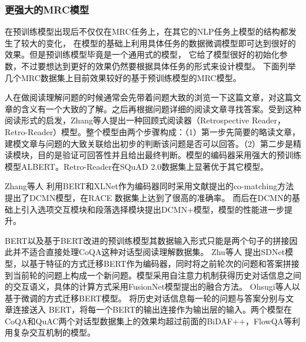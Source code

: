 \subsubsection{更强大的MRC模型}
在预训练模型出现后不仅仅在MRC任务上，在其它的NLP任务上模型的结构都发生了较大的变化，
在模型的基础上利用具体任务的数据微调模型即可达到很好的效果。但是预训练模型毕竟是一个通用式的模型，
它给了模型很好的初始化参数，不过要想达到更好的效果仍然要根据具体任务的形式来设计模型。
下面列举几个MRC数据集上目前效果较好的基于预训练模型的MRC模型。

人在做阅读理解问题的时候通常会先带着问题大致的浏览一下这篇文章，对这篇文章的含义有一个大致的了解。之后再根据问题详细的阅读文章寻找答案。受到这种阅读形式的启发，Zhang等人提出一种回顾式阅读器（Retrospective Reader，Retro-Reader）模型。整个模型由两个步骤构成：（1）第一步先简要的略读文章，建模文章与问题的大致关联给出初步的判断该问题是否可以回答。（2）第二步是精读模块，目的是验证可回答性并且给出最终判断。模型的编码器采用强大的预训练模型ALBERT。Retro-Reader在SQuAD 2.0数据集上显著优于其它模型。

Zhang等人
利用BERT和XLNet作为编码器同时采用文献\cite{Co-matching}提出的co-matching方法提出了DCMN模型，在RACE
数据集上达到了很高的准确率。
而后在DCMN的基础上引入选项交互模块和段落选择模块提出DCMN+模型，模型的性能进一步提升。

BERT以及基于BERT改进的预训练模型其数据输入形式只能是两个句子的拼接因此并不适合直接处理CoQA这种对话型阅读理解数据集。
Zhu等人
提出SDNet模型，以基于特征的方式迁移BERT作为编码器，同时将之前轮次的问题和答案拼接到当前轮的问题上构成一个新问题。模型采用自注意力机制获得历史对话信息之间的交互语义，具体的计算方式采用FusionNet模型提出的融合方法。
Ohsugi等人以基于微调的方式迁移BERT模型。
将历史对话信息每一轮的问题与答案分别与文章连接送入
BERT，将每一个BERT的输出连接作为输出层的输入。两个模型在CoQA和QuAC两个对话型数据集上的效果均超过前面的BiDAF++，FlowQA等利用复杂交互机制的模型。








